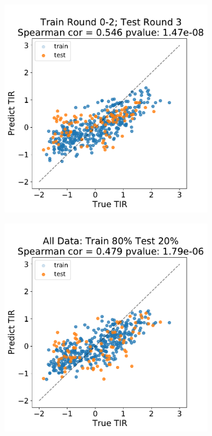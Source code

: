 \documentclass{article}
\begin{document}
\begin{figure}[!ht]
\begin{subfigure}[b]{0.49\textwidth}
    \end{subfigure}
    \begin{subfigure}[b]{0.49\textwidth}
        \centering
        \caption{}
        \includegraphics[scale=0.4]{plots/Main_Paper/scatter_abc1_FF_2.pdf}
    \end{subfigure}
    \begin{subfigure}[b]{0.49\textwidth}
        \centering
        \caption{}
        \includegraphics[scale=0.4]{plots/Main_Paper/scatter_abc1_FF_3.pdf}

\end{subfigure}
\end{figure}
\end{document}
